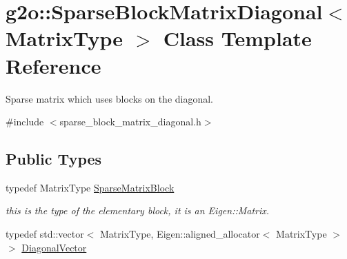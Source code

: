 \hypertarget{classg2o_1_1_sparse_block_matrix_diagonal}{}\section{g2o\+:\+:Sparse\+Block\+Matrix\+Diagonal$<$ Matrix\+Type $>$ Class Template Reference}
\label{classg2o_1_1_sparse_block_matrix_diagonal}


Sparse matrix which uses blocks on the diagonal.  




{\ttfamily \#include $<$sparse\+\_\+block\+\_\+matrix\+\_\+diagonal.\+h$>$}

\subsection*{Public Types}
\begin{DoxyCompactItemize}
\item 
typedef Matrix\+Type \mbox{\hyperlink{classg2o_1_1_sparse_block_matrix_diagonal_a93a57bc93d5b099fcd424ba1fc1a0585}{Sparse\+Matrix\+Block}}
\begin{DoxyCompactList}\small\item\em this is the type of the elementary block, it is an Eigen\+::\+Matrix. \end{DoxyCompactList}\item 
typedef std\+::vector$<$ Matrix\+Type, Eigen\+::aligned\+\_\+allocator$<$ Matrix\+Type $>$ $>$ \mbox{\hyperlink{classg2o_1_1_sparse_block_matrix_diagonal_a2eb7fc4130fac5c499b57f3bec855812}{Diagonal\+Vector}}
\end{DoxyCompactItemize}
